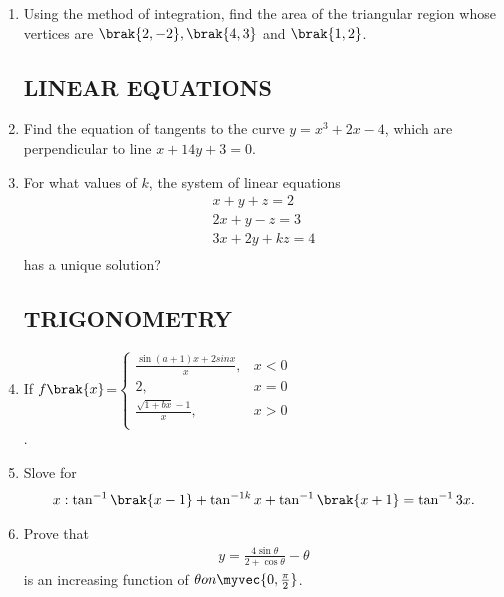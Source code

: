 \documentclass[12pt, -letter paper]{article}
\begin{document}
\begin{enumerate}
\item Using the method of integration, find the area     of the triangular region whose vertices are $\brak{2,-2}, \brak{4,3}$ and $\brak{1,2}$.




     \subsection*{LINEAR EQUATIONS}			

  \item Find the equation of tangents to the curve $y=x^3+2x-4$, which are perpendicular to line $x+14y+3=0$.
		
   \item For what values of $k$, the system of linear equations \begin{align*}                                                   x+y+z=2\\       2x+y-z=3\\      3x+2y+kz=4\\  \end{align*} 
   has a unique solution? 
 
     \subsection*{TRIGONOMETRY}


     \item If $f\brak{x}$=$\begin{cases}
    \frac{\sin(a+1)x+2 sinx}{x},&x<0\\   2  ,&x=0\\ \frac{\sqrt{1+bx}-1}{x},&x>0\\ \end{cases}$ \\
   .


 \item Slove for \begin{align*} x:\tan^{-1}\brak{x-1}+\tan^{-1k}x+\tan^{-1}\brak{x+1}=\tan^{-1}3x.\end{align*}

\item Prove that \begin{align*} y=\frac{4\sin{\theta}}{2+\cos    {\theta}}-\theta \end{align*} is an increasing function of $\theta on  \myvec{0,\frac{\pi}{2}}$.




\end{enumerate}
\end{document}

